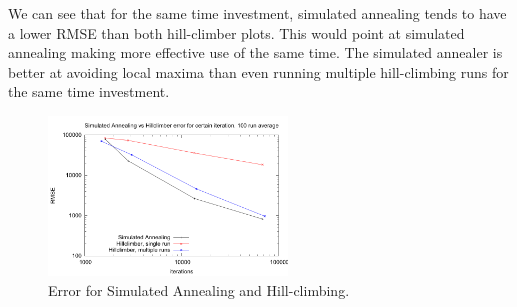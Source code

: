 \documentclass[journal]{IEEEtran}
\begin{document}
We can see that for the same time investment, simulated annealing tends to have a lower RMSE than both hill-climber plots. This would point at simulated annealing making more effective use of the same time. The simulated annealer is better at avoiding local maxima than even running multiple hill-climbing runs for the same time investment.
\begin{figure}[H]
\centering
\includegraphics[width=2.5in]{iterations_vs_error_sa_hc}
\caption{Error for Simulated Annealing and Hill-climbing.\tiny}
\label{fig:error_sa_hc}
\end{figure}
\end{document}
